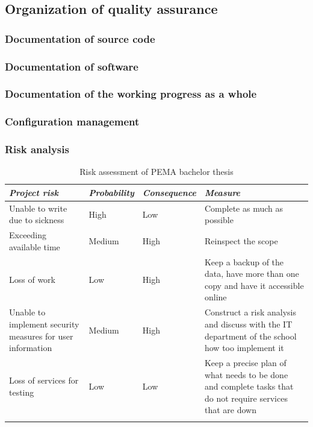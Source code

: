 \documentclass{article}
\begin{document}
\subsection{\textbf{Organization of quality assurance}}
\subsubsection{\textbf{Documentation of source code}}
\subsubsection{\textbf{Documentation of software}}
\subsubsection{\textbf{Documentation of the working progress as a whole}}
\subsubsection{\textbf{Configuration management}}
\subsubsection{\textbf{Risk analysis}}

\begin{table}[htbp]
    \centering
    \hline
    \begin{tabularx}{\linewidth}{|X|X|X|X|}
    \textit{\textbf{Project risk}} & \textit{\textbf{Probability}} & \textit{\textbf{Consequence}} & \textit{\textbf{Measure}} \tabularnewline \hline
    Unable to write due to sickness & \cellcolor[HTML]{FE0000} High & Low & Complete as much as possible  \tabularnewline \hline
    Exceeding available time &\cellcolor[HTML]{F8FF00}Medium   & \cellcolor[HTML]{FE0000} High   & Reinspect the scope  \tabularnewline \hline
    Loss of work & Low  & \cellcolor[HTML]{FE0000} High   & Keep a backup of the data, have more than one copy and have it accessible online \tabularnewline \hline
    Unable to implement security measures for user information & \cellcolor[HTML]{F8FF00}Medium     & \cellcolor[HTML]{FE0000} High   & Construct a risk analysis and discuss with the IT department of the school how too implement it  \tabularnewline \hline
    Loss of services for testing    & Low   & Low   & Keep a precise plan of what needs to be done and complete tasks that do not require services that are down \tabularnewline \hline
        &   &   & \tabularnewline \hline
    
    \end{tabularx}
    \caption{Risk assessment of PEMA bachelor thesis}
    \label{tab:my_label}
\end{table}
\end{document}
